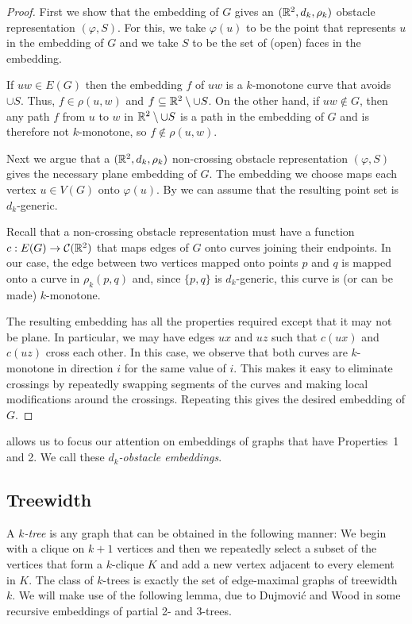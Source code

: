 \documentclass{patmorin}
\begin{document}
\begin{proof}
   First we show that the embedding of $G$ gives an $(\mathbb{R}^2,d_k,\rho_k)$
   obstacle representation $(\varphi, S)$. For this, we take $\varphi(u)$
   to be the point that represents $u$ in the embedding of $G$ and we
   take $S$ to be the set of (open) faces in the embedding.

   If $uw\in E(G)$ then the embedding $f$ of $uw$ is a $k$-monotone
   curve that avoids $\cup S$.  Thus, $f\in\rho(u,w)$ and $f\subseteq
   \mathbb{R}^2\setminus{\cup S}$.  On the other hand, if $uw\not\in G$,
   then any path $f$ from $u$ to $w$ in $\mathbb{R}^2\setminus{\cup S}$ is
   a path in the embedding of $G$ and is therefore not $k$-monotone,
   so $f\not\in \rho(u,w)$.

   Next we argue that a $(\mathbb{R}^2,d_k,\rho_k)$ non-crossing obstacle
   representation $(\varphi, S)$ gives the necessary plane embedding
   of $G$.  The embedding we choose maps each vertex $u\in V(G)$ onto
   $\varphi(u)$.  By  we can assume that the resulting
   point set is $d_k$-generic.  


   Recall that a non-crossing obstacle representation must have a
   function $c:E(G)\to\mathcal{C}(\mathbb{R}^2)$ that maps edges of $G$ onto
   curves joining their endpoints.  In our case, the edge between two
   vertices mapped onto points $p$ and $q$ is mapped onto a curve in
   $\rho_k(p,q)$ and, since $\{p,q\}$ is $d_k$-generic, this curve is
   (or can be made) $k$-monotone.

   The resulting embedding has all the properties required except that
   it may not be plane.  In particular, we may have edges $ux$ and $uz$ 
   such that $c(ux)$ and $c(uz)$ cross each other.
   In this case, we observe that both
   curves are $k$-monotone in direction $i$ for the same value of $i$.
   This makes it easy to eliminate crossings by repeatedly swapping
   segments of the curves and making local modifications around the
   crossings.  Repeating this gives the desired embedding of $G$.
\end{proof}

 allows us to focus our attention on embeddings
of graphs that have Properties~1 and 2.  We call these \emph{$d_k$-obstacle
embeddings}.

\subsection{Treewidth}

A \emph{$k$-tree} is any graph that can be obtained in the following
manner:  We begin with a clique on $k+1$ vertices and then we repeatedly
select a subset of the vertices that form a $k$-clique $K$ and add a
new vertex adjacent to every element in $K$.  The class of $k$-trees is
exactly the set of edge-maximal graphs of treewidth $k$.  We will make
use of the following lemma, due to Dujmovi\'c and Wood \cite[Lemma~Y]{X}
in some recursive embeddings of partial 2- and 3-trees.
\end{document}
